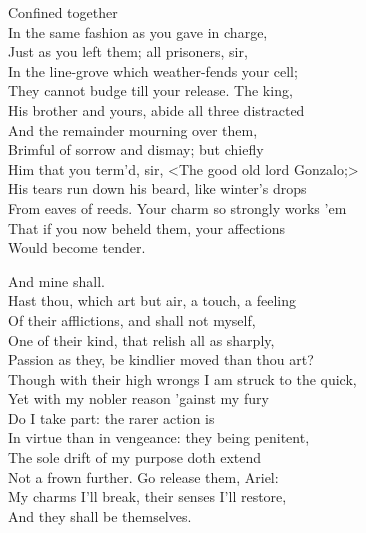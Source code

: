 \begin{verse_speech}[Ariel] 
Confined together\\
In the same fashion as you gave in charge,\\
Just as you left them; all prisoners, sir,\\
In the line-grove which weather-fends your cell;\\
They cannot budge till your release. The king,\\
His brother and yours, abide all three distracted\\
And the remainder mourning over them,\\
Brimful of sorrow and dismay; but chiefly\\
Him that you term'd, sir, <The good old lord Gonzalo;>\\
His tears run down his beard, like winter's drops\\
From eaves of reeds. Your charm so strongly works 'em\\
That if you now beheld them, your affections\\
Would become tender.
\end{verse_speech}



\begin{verse_speech}[Prospero] 
And mine shall.\\
Hast thou, which art but air, a touch, a feeling\\
Of their afflictions, and shall not myself,\\
One of their kind, that relish all as sharply,\\
Passion as they, be kindlier moved than thou art?\\
Though with their high wrongs I am struck to the quick,\\
Yet with my nobler reason 'gainst my fury\\
Do I take part: the rarer action is\\
In virtue than in vengeance: they being penitent,\\
The sole drift of my purpose doth extend\\
Not a frown further. Go release them, Ariel:\\
My charms I'll break, their senses I'll restore,\\
And they shall be themselves.
\end{verse_speech}

